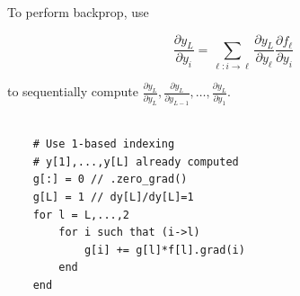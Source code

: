 \documentclass{report}
\begin{document}
\begin{definition}
    To perform backprop, use

    $$
    \frac{\partial y_{L}}{\partial y_{i}}=\sum_{\ell: i \rightarrow \ell} \frac{\partial y_{L}}{\partial y_{\ell}} \frac{\partial f_{\ell}}{\partial y_{i}}
    $$

    to sequentially compute $\frac{\partial y_{L}}{\partial y_{L}}, \frac{\partial y_{L}}{\partial y_{L-1}}, \ldots, \frac{\partial y_{L}}{\partial y_{1}}$.\\\\ 

    \begin{verbatim}
    # Use 1-based indexing
    # y[1],...,y[L] already computed
    g[:] = 0 // .zero_grad()
    g[L] = 1 // dy[L]/dy[L]=1
    for l = L,...,2
        for i such that (i->l)
            g[i] += g[l]*f[l].grad(i)
        end
    end
    \end{verbatim}
\end{definition}
\end{document}

